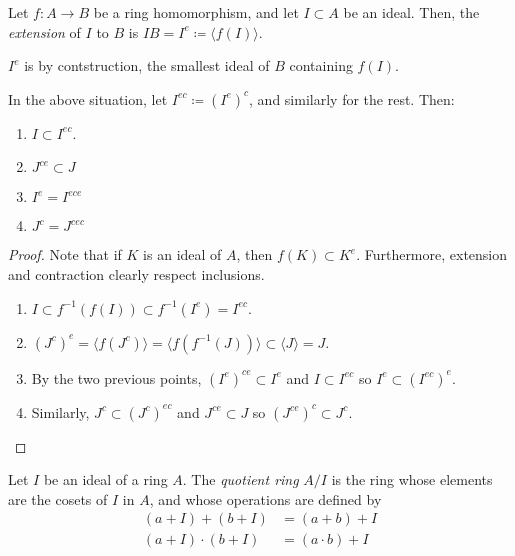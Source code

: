         \begin{defn}
            Let $f: A \rightarrow B$ be a ring homomorphism, and let $I \subset A$ be an ideal.
            Then, the \emph{extension} of $ I$ to $B$ is $IB = I^{e} \coloneqq \langle f(I) \rangle$.
        \end{defn}

        \begin{rk}
            $I^{e}$ is by contstruction, the smallest ideal of $B$ containing $f(I)$.
        \end{rk}

        \begin{prop} \label{prop:extension-and-contraction}
            In the above situation, let $I^{ec} \coloneqq (I^e)^c$, and similarly for the rest.
            Then:
            \begin{enumerate}
                \item $I \subset I^{ec}$.
                \item $J^{ce} \subset J$
                \item $I^e = I^{ece}$
                \item $J^c = J^{cec}$
            \end{enumerate}
        \end{prop}

        \begin{proof}
            Note that if $K$ is an ideal of $A$, then $f(K) \subset K^e$.
            Furthermore, extension and contraction clearly respect inclusions.
            \begin{enumerate}
                \item $I \subset f^{-1}(f(I)) \subset f^{-1}(I^e) = I^{ec}$.
                \item $(J^{c})^e = \langle f(J^c) \rangle = \langle f(f^{-1}(J))\rangle \subset \langle J  \rangle = J$.

                \item By the two previous points, $(I^e)^{ce} \subset I^e$ and $I\subset I^{ec}$ so
                $I^e \subset (I^{ec})^e$.

                \item Similarly, $J^c \subset (J^c)^{ec}$ and $J^{ce} \subset J$ so
                $(J^{ce})^c \subset J^c$.
            \end{enumerate}
        \end{proof}

        \begin{defn}
            Let $I$ be an ideal of a ring $A$.
            The \emph{quotient ring} $A/I$ is the ring whose elements are the cosets of $I$ in $A$, and whose operations are defined by
            \begin{align}
                (a + I) + (b + I) &= (a + b) + I \nonumber \\
                (a + I) \cdot (b + I) &= (a \cdot b) + I \nonumber
            \end{align}
        \end{defn}

